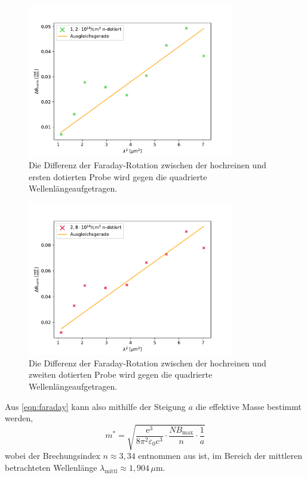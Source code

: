         \begin{figure}[h]
            \centering
            \includegraphics[width = 0.8\textwidth]{plots/Faraday_1.pdf}
            \caption{Die Differenz der Faraday-Rotation zwischen der hochreinen und ersten dotierten Probe wird gegen die quadrierte Wellenlängeaufgetragen.}
            \label{fig:Faraday_1}
        \end{figure}

        \FloatBarrier

        \begin{figure}[h]
            \centering
            \includegraphics[width = 0.8\textwidth]{plots/Faraday_2.pdf}
            \caption{Die Differenz der Faraday-Rotation zwischen der hochreinen und zweiten dotierten Probe wird gegen die quadrierte Wellenlängeaufgetragen.}
            \label{fig:Faraday_2}
        \end{figure}

        \FloatBarrier

        Aus \eqref{eqn:faraday} kann also mithilfe der Steigung $a$ die effektive Masse bestimmt werden,
        \begin{equation*}
            m^* = \sqrt{\frac{\text{e}^3}{8\pi^2\varepsilon_0 \text{c}^3} \cdot \frac{N B_{\text{max}}}{n} \cdot \frac{1}{a}}
        \end{equation*}
        wobei der Brechungsindex $n \approx 3,34$ entnommen aus \cite{dargys_handbook_1994} ist, im Bereich der mittleren betrachteten Wellenlänge $\lambda_{\text{mittl}} \approx 1,904 \, \mu$m.

